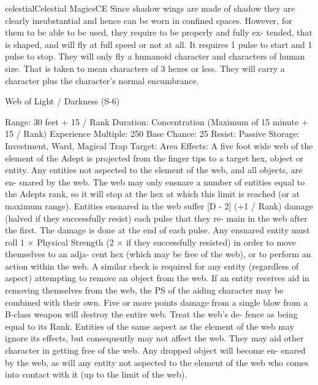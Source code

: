 \begin{College}[1.3]{celestial}{Celestial Magics}{CE}
Since  shadow  wings  are  made  of  shadow  they  are 
clearly  insubstantial  and  hence  can  be  worn  in 
confined  spaces.  However,  for  them  to  be  able  to 
be  used,  they  require  to  be  properly  and  fully  ex-
tended, that is shaped, and will fly at full speed or 
not at all. It requires 1 pulse to start and 1 pulse to 
stop.  They  will  only  fly  a  humanoid character  and 
characters  of  human  size.  That  is  taken  to  mean 
characters  of  3  hexes  or  less.  They  will  carry  a 
character plus the character’s normal encumbrance. 

Web of Light / Darkness (S-6) 

Range: 30 feet + 15 / Rank 
Duration:  Concentration  (Maximum  of  15  minute 
+ 15 / Rank) 
Experience Multiple: 250 
Base Chance: 25%
Resist: Passive 
Storage: Investment, Ward, Magical Trap 
Target: Area 
Effects: A five foot wide web of the element of the 
Adept  is  projected  from  the  finger  tips  to  a  target 
hex,  object  or  entity.  Any  entities  not  aspected  to 
the  element  of  the  web,  and  all  objects,  are  en-
snared  by  the  web.  The  web  may  only  ensnare  a 
number  of  entities  equal  to  the  Adepts  rank,  so  it 
will  stop  at  the  hex  at  which  this  limit  is  reached 
(or  at  maximum  range).  Entities  ensnared  in  the 
web  suffer  [D  -  2]  (+1  /  Rank)  damage  (halved  if 
they  successfully  resist)  each  pulse  that  they  re-
main in the web after the first. The damage is done 
at the end of each pulse. Any ensnared entity must 
roll 1 × Physical Strength (2 × if they successfully 
resisted)  in  order  to  move  themselves  to  an  adja-
cent  hex  (which  may  be  free  of  the  web),  or  to 
perform an action within the web. A similar check 
is  required  for  any  entity  (regardless  of  aspect) 
attempting to remove an object from the web. If an 
entity  receives  aid  in  removing  themselves  from 
the  web,  the  PS  of  the  aiding  character  may  be 
combined  with  their  own.  Five  or  more  points 
damage from a single blow from a B-class weapon 
will  destroy  the  entire  web.  Treat  the  web’s  de-
fence  as  being  equal  to  its  Rank.  Entities  of  the 
same aspect as the element of the web may ignore 
its  effects,  but  consequently  may  not  affect  the 
web.  They  may  aid  other  character  in  getting  free 
of  the  web.  Any  dropped  object  will  become  en-
snared by  the  web,  as  will  any  entity  not  aspected 
to  the  element  of  the  web  who  comes  into  contact 
with it (up to the limit of the web). 


\end{College}
